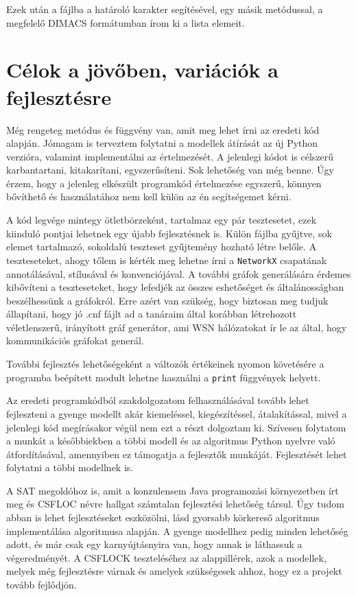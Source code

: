 \documentclass[
]{thesis-ekf}
\theoremstyle{definition}
\theoremstyle{remark}
\begin{document}
	Ezek után a fájlba a határoló karakter segítésével, egy másik metódussal, a megfelelő \textsc{DIMACS} formátumban írom ki a lista elemeit.
	
	\section{Célok a jövőben, variációk a fejlesztésre}
	
	Még rengeteg metódus és függvény van, amit meg lehet írni az eredeti kód \cite{github-py08} alapján. Jómagam is terveztem folytatni a modellek átírását az új Python verzióra, valamint implementálni az értelmezését. A jelenlegi kódot is célszerű karbantartani, kitakarítani, egyszerűsíteni. Sok lehetőség van még benne. Úgy érzem, hogy a jelenleg elkészült programkód értelmezése egyszerű, könnyen bővíthető és használatához nem kell külön az én segítségemet kérni.
	
	A kód legvége mintegy ötletbörzeként, tartalmaz egy pár tesztesetet, ezek kiinduló pontjai lehetnek egy újabb fejlesztésnek is. Külön fájlba gyűjtve, sok elemet tartalmazó, sokoldalú teszteset gyűjtemény hozható létre belőle. A teszteseteket, ahogy tőlem is kérték meg lehetne írni a \texttt{NetworkX} csapatának annotálásával, stílusával és konvenciójával. A további gráfok generálására érdemes kibővíteni a teszteseteket, hogy lefedjék az összes eshetőséget és általánosságban beszélhessünk a gráfokról. Erre azért van szükség, hogy biztosan meg tudjuk állapítani, hogy jó .cnf fájlt ad a tanáraim által korábban létrehozott véletlenszerű, irányított gráf generátor, ami \textsc{WSN} hálózatokat \cite{am} ír le az által, hogy kommunikációs gráfokat generál.
	
	További fejlesztés lehetőségeként a változók értékeinek nyomon követésére a programba beépített modult lehetne használni a \texttt{print} függvények helyett.
	
	Az eredeti programkódból szakdolgozatom felhasználásával tovább lehet fejleszteni a gyenge modellt akár kiemeléssel, kiegészítéssel, átalakítással, mivel a jelenlegi kód megírásakor végül nem ezt a részt dolgoztam ki. Szívesen folytatom a munkát a későbbiekben a többi modell és az algoritmus Python nyelvre való átfordításával, amennyiben ez támogatja a fejlesztők munkáját. Fejlesztését lehet folytatni a többi modellnek is.

	A \textsc{SAT} megoldóhoz is, amit a konzulensem Java programozási környezetben írt meg és \textsc{CSFLOC} névre hallgat számtalan fejlesztési lehetőség társul. Úgy tudom abban is lehet fejlesztéseket eszközölni, lásd gyorsabb körkereső algoritmus implementálása \cite[Johnson]{johnson} algoritmusa alapján. A gyenge modellhez pedig minden lehetőség adott, és már csak egy karnyújtásnyira van, hogy annak is láthassuk a végeredményét.	A \textsc{CSFLOCK} teszteléséhez az alappillérek, azok a modellek, melyek még fejlesztésre várnak és amelyek szükségesek ahhoz, hogy ez a projekt tovább fejlődjön.
	
\end{document}
